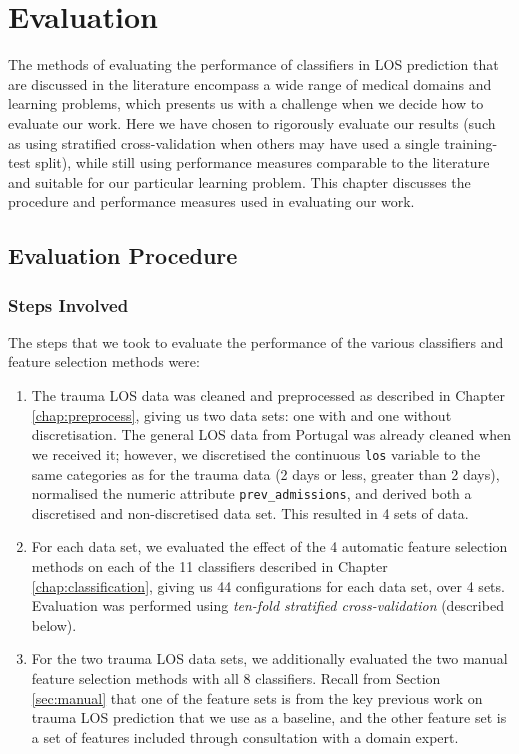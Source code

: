 \chapter{Evaluation} \label{chap:evaluation}

The methods of evaluating the performance of classifiers in LOS prediction
that are discussed in the literature encompass a wide range of medical
domains and learning problems, which presents us with a challenge when we
decide how to evaluate our work. Here we have chosen to rigorously evaluate
our results (such as using stratified cross-validation when others may have
used a single training-test split), while still using performance measures
comparable to the literature and suitable for our particular learning problem.
This chapter discusses the procedure and performance measures used
in evaluating our work.

\section{Evaluation Procedure}
\subsection{Steps Involved}
The steps that we took to evaluate the performance of the various classifiers
and feature selection methods were:
\begin{enumerate}
\item The trauma LOS data was cleaned and preprocessed as described in Chapter
\ref{chap:preprocess}, giving us two data sets: one with and one without
discretisation. The general LOS data from Portugal was already cleaned when we
received it; however, we discretised the continuous \texttt{los} variable to
the same categories as for the trauma data (2 days or less, greater than 2
days), normalised the numeric attribute \texttt{prev\_admissions}, and derived
both a discretised and non-discretised data set. This resulted in 4 sets of
data.
\item For each data set, we evaluated the effect of the 4 automatic feature
selection methods on each of the 11 classifiers described in Chapter
\ref{chap:classification}, giving us 44 configurations for each data set, over
4 sets. Evaluation was performed using \textit{ten-fold stratified
cross-validation} (described below).
\item For the two trauma LOS data sets, we additionally evaluated the two
manual feature selection methods with all 8 classifiers. Recall from Section
\ref{sec:manual} that one of the feature sets is from the key previous work
on trauma LOS prediction that we use as a baseline, and the other feature set
is a set of features included through consultation with a domain expert.
\end{enumerate}

